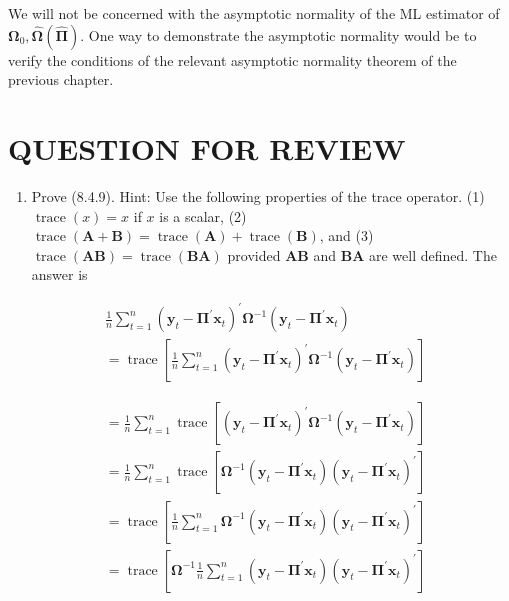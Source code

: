 \documentclass[10pt]{article}
\begin{document}
We will not be concerned with the asymptotic normality of the ML estimator of $\boldsymbol{\Omega}_{0}, \widehat{\boldsymbol{\Omega}}(\widehat{\boldsymbol{\Pi}})$. One way to demonstrate the asymptotic normality would be to verify the conditions of the relevant asymptotic normality theorem of the previous chapter.

\section*{QUESTION FOR REVIEW}
\begin{enumerate}
  \item Prove (8.4.9). Hint: Use the following properties of the trace operator. (1) $\operatorname{trace}(x)=x$ if $x$ is a scalar, (2) $\operatorname{trace}(\mathbf{A}+\mathbf{B})=\operatorname{trace}(\mathbf{A})+\operatorname{trace}(\mathbf{B})$, and (3) $\operatorname{trace}(\mathbf{A B})=\operatorname{trace}(\mathbf{B A})$ provided $\mathbf{A B}$ and $\mathbf{B A}$ are well defined. The answer is
\end{enumerate}

$$
\begin{aligned}
& \frac{1}{n} \sum_{t=1}^{n}\left(\mathbf{y}_{t}-\boldsymbol{\Pi}^{\prime} \mathbf{x}_{t}\right)^{\prime} \boldsymbol{\Omega}^{-1}\left(\mathbf{y}_{t}-\boldsymbol{\Pi}^{\prime} \mathbf{x}_{t}\right) \\
& =\operatorname{trace}\left[\frac{1}{n} \sum_{t=1}^{n}\left(\mathbf{y}_{t}-\boldsymbol{\Pi}^{\prime} \mathbf{x}_{t}\right)^{\prime} \boldsymbol{\Omega}^{-1}\left(\mathbf{y}_{t}-\boldsymbol{\Pi}^{\prime} \mathbf{x}_{t}\right)\right]
\end{aligned}
$$

$$
\begin{aligned}
& =\frac{1}{n} \sum_{t=1}^{n} \operatorname{trace}\left[\left(\mathbf{y}_{t}-\boldsymbol{\Pi}^{\prime} \mathbf{x}_{t}\right)^{\prime} \boldsymbol{\Omega}^{-1}\left(\mathbf{y}_{t}-\boldsymbol{\Pi}^{\prime} \mathbf{x}_{t}\right)\right] \\
& =\frac{1}{n} \sum_{t=1}^{n} \operatorname{trace}\left[\boldsymbol{\Omega}^{-1}\left(\mathbf{y}_{t}-\boldsymbol{\Pi}^{\prime} \mathbf{x}_{t}\right)\left(\mathbf{y}_{t}-\boldsymbol{\Pi}^{\prime} \mathbf{x}_{t}\right)^{\prime}\right] \\
& =\operatorname{trace}\left[\frac{1}{n} \sum_{t=1}^{n} \boldsymbol{\Omega}^{-1}\left(\mathbf{y}_{t}-\boldsymbol{\Pi}^{\prime} \mathbf{x}_{t}\right)\left(\mathbf{y}_{t}-\boldsymbol{\Pi}^{\prime} \mathbf{x}_{t}\right)^{\prime}\right] \\
& =\operatorname{trace}\left[\boldsymbol{\Omega}^{-1} \frac{1}{n} \sum_{t=1}^{n}\left(\mathbf{y}_{t}-\boldsymbol{\Pi}^{\prime} \mathbf{x}_{t}\right)\left(\mathbf{y}_{t}-\boldsymbol{\Pi}^{\prime} \mathbf{x}_{t}\right)^{\prime}\right]
\end{aligned}
$$
\end{document}
